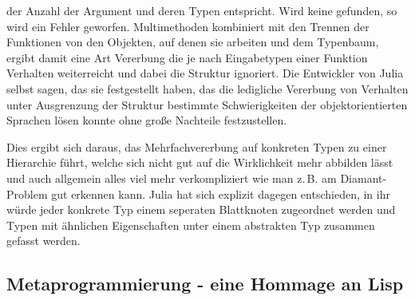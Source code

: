 \documentclass[proseminar,german,utf8]{zihpub}
\newcommand{\zB}[0]{{z.\,B. }}
\begin{document}
der Anzahl der Argument und deren Typen entspricht. Wird keine gefunden, so wird ein Fehler geworfen. Multimethoden kombiniert mit den Trennen der Funktionen von den Objekten, auf denen sie arbeiten und dem Typenbaum, ergibt damit eine Art Vererbung die je nach Eingabetypen einer Funktion Verhalten weiterreicht und dabei die Struktur ignoriert. Die Entwickler von Julia selbst sagen, das sie festgestellt haben, das die ledigliche Vererbung von Verhalten unter Ausgrenzung der Struktur bestimmte Schwierigkeiten der objektorientierten Sprachen lösen konnte ohne große Nachteile festzustellen. 

Dies ergibt sich daraus, das Mehrfachvererbung auf konkreten Typen zu einer Hierarchie führt, welche sich nicht gut auf die Wirklichkeit mehr abbilden lässt und auch allgemein alles viel mehr verkompliziert wie man \zB am Diamant-Problem gut erkennen kann. Julia hat sich explizit dagegen entschieden, in ihr würde jeder konkrete Typ einem seperaten Blattknoten zugeordnet werden und Typen mit ähnlichen Eigenschaften unter einem abstrakten Typ zusammen gefasst werden.~\cite{JuliaLangDocumentation}~\cite{WordpressJuliaOO}~\cite{MultiDispatchWiki}

\subsection{Metaprogrammierung - eine Hommage an Lisp}
\end{document}
